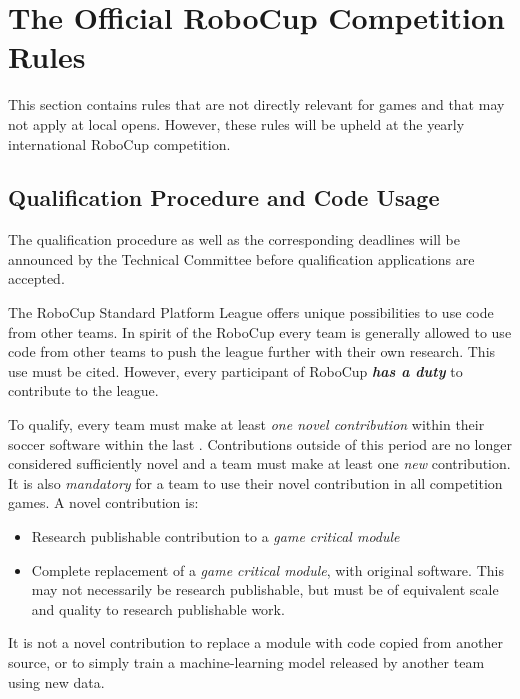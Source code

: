 \section{The Official RoboCup Competition Rules}
\label{sec:comRules}

This section contains rules that are not directly relevant for games and that may not apply at local opens.
However, these rules will be upheld at the yearly international RoboCup competition.

\subsection{Qualification Procedure and Code Usage}
\label{sec:qualification_procedure_codeuse}

The qualification procedure as well as the corresponding deadlines will be announced by the Technical Committee before qualification applications are accepted.

The RoboCup Standard Platform League offers unique possibilities to use code from other teams.
In spirit of the RoboCup every team is generally allowed to use code from other teams to push the league further with their own research.
This use must be cited.
However, every participant of RoboCup \textbf{\textit{has a duty}} to contribute to the league.

To qualify, every team must make at least \textit{one novel contribution} within their soccer software within the last \NovelContributionTime.
Contributions outside of this period are no longer considered sufficiently novel and a team must make at least one \textit{new} contribution.
It is also \textit{mandatory} for a team to use their novel contribution in all competition games.
A novel contribution is:
\begin{itemize}
  \item Research publishable contribution to a \textit{game critical module}
  \item Complete replacement of a \textit{game critical module}, with original software.
    This may not necessarily be research publishable, but must be of equivalent scale and quality to research publishable work.
\end{itemize}

It is not a novel contribution to replace a module with code copied from another source, or to simply train a machine-learning model released by another team using new data.


